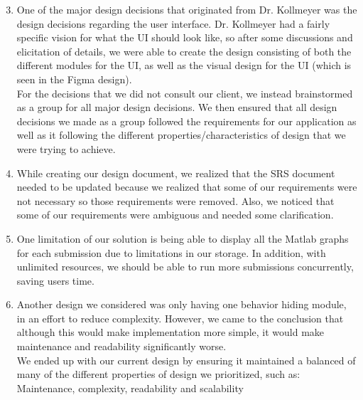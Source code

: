 \documentclass[12pt, titlepage]{article}
\begin{document}
\begin{enumerate}
\setcounter{enumi}{2}
    \item One of the major design decisions that originated from Dr. Kollmeyer was the design decisions regarding the user interface. Dr. Kollmeyer had a fairly specific vision for what the UI should look like, so after some discussions and elicitation of details, we were able to create the design consisting of both the different modules for the UI, as well as the visual design for the UI (which is seen in the Figma design). \\

    For the decisions that we did not consult our client, we instead brainstormed as a group for all major design decisions. We then ensured that all design decisions we made as a group followed the requirements for our application as well as it following the different properties/characteristics of design that we were trying to achieve.
    \item While creating our design document, we realized that the SRS document needed to be updated because we realized that some of our requirements were not necessary so those requirements were removed. Also, we noticed that some of our requirements were ambiguous and needed some clarification.
    \item One limitation of our solution is being able to display all the Matlab graphs for each submission due to limitations in our storage. In addition, with unlimited resources, we should be able to run more submissions concurrently, saving users time. 
    \item Another design we considered was only having one behavior hiding module, in an effort to reduce complexity. However, we came to the conclusion that although this would make implementation more simple, it would make maintenance and readability significantly worse.\\

    We ended up with our current design by ensuring it maintained a balanced of many of the different properties of design we prioritized, such as: Maintenance, complexity, readability and scalability 
\end{enumerate}
\end{document}
